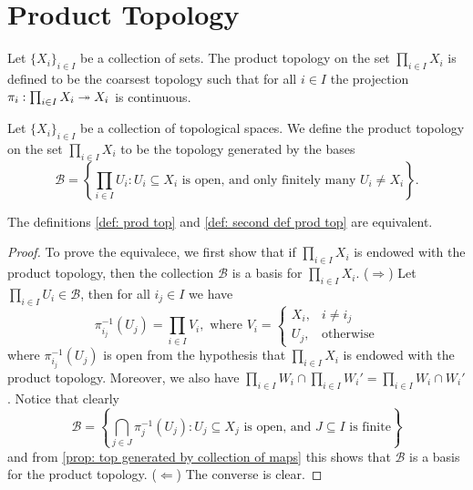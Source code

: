 \section{Product Topology}

\begin{definition}
  \label{def: prod top}
  Let \(\{X_i\}_{i \in I}\) be a collection of sets. The product topology on the
  set \(\prod_{i \in I} X_i\) is defined to be the coarsest topology such that
  for all \(i \in I\) the projection \(\pi_i : \prod_{i \in I} X_i \twoheadrightarrow X_i\) is
  continuous.
\end{definition}

\begin{definition}
  \label{def: second def prod top}
  Let \(\{X_i\}_{i \in I}\) be a collection of topological spaces. We
  define the product topology on the set \(\prod_{i \in I} X_i\) to be the
  topology generated by the bases
  \[
    \mathcal B = \left\{ \prod_{i \in I} U_i : U_i \subseteq X_i
    \text{ is open, and only finitely many } U_i \neq X_i \right\}.
  \]
\end{definition}

\begin{corollary}\label{cor: equivalent defs prod top}
  The definitions \ref{def: prod top} and \ref{def: second def prod top}
  are equivalent.
\end{corollary}

\begin{proof}
  To prove the equivalece, we first show that if \(\prod_{i \in I} X_i\) is
  endowed with the product topology, then the collection \(\mathcal B\) is a
  basis for \(\prod_{i \in I} X_i\). (\(\Rightarrow\)) Let \(\prod_{i \in I} U_i
  \in \mathcal B\), then for all \(i_j \in I\) we have
  \[
    \pi_{i_j}^{-1}(U_j) = \prod_{i \in I} V_i, \text{ where } V_i =
    \begin{cases}
      X_i, &i \neq i_j \\
      U_j, &\text{otherwise}
    \end{cases}
  \]
  where \(\pi_{i_j}^{-1}(U_j)\) is open from the hypothesis that \(\prod_{i
  \in I} X_i\) is endowed with the product topology. Moreover, we also have
  \(\prod_{i \in I} W_i \cap \prod_{i \in I} W_i' = \prod_{i \in I} W_i \cap
  W_i'\). Notice that clearly
  \[
    \mathcal B = \left\{ \bigcap_{j \in J} \pi_j^{-1}(U_j) : U_j \subseteq X_j
    \text{ is open, and } J \subseteq I \text{ is finite}\right\}
  \]
  and from \cref{prop: top generated by collection of maps} this shows that
  \(\mathcal B\) is a basis for the product topology. (\(\Leftarrow\)) The
  converse is clear.
\end{proof}

